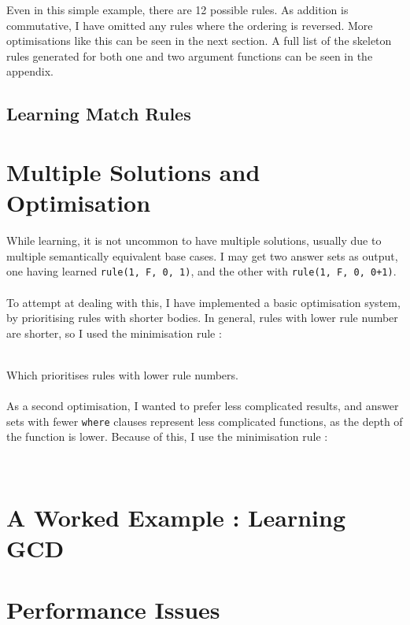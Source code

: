Even in this simple example, there are 12 possible rules. As addition is commutative, I have omitted any rules where the ordering is reversed. More optimisations like this can be seen in the next section.
A full list of the skeleton rules generated for both one and two argument functions can be seen in the appendix.

\subsection{Learning Match Rules}


\section{Multiple Solutions and Optimisation}
While learning, it is not uncommon to have multiple solutions, usually due to multiple semantically equivalent base cases. I may get two answer sets as output, one having learned \lstinline{rule(1, F, 0, 1)}, and the other with \lstinline{rule(1, F, 0, 0+1)}. \\ \\
To attempt at dealing with this, I have implemented a basic optimisation system, by prioritising rules with shorter bodies. In general, rules with lower rule number are shorter, so I used the minimisation rule :


\mbox{}\\
Which prioritises rules with lower rule numbers.\\ \\
As a second optimisation, I wanted to prefer less complicated results, and answer sets with fewer \lstinline{where} clauses represent less complicated functions, as the depth of the function is lower. Because of this, I use the minimisation rule : %


\mbox{}\\

\section{A Worked Example : Learning GCD}

\section{Performance Issues}
\pagebreak
%
%